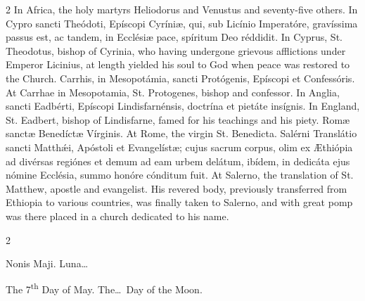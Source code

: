 \begin{paracol}{2}
\switchcolumn
{}
In Africa, the holy martyrs 
 Heliodorus and Venustus and seventy-five others.
\switchcolumn*
{}
In Cypro sancti 
 Theódoti, Epíscopi Cyríniæ, qui, sub Licínio Imperatóre, gravíssima passus 
 est, ac tandem, in Ecclésiæ pace, spíritum Deo réddidit.
\switchcolumn
{}
In Cyprus, St. Theodotus, bishop of 
 Cyrinia, who having undergone grievous afflictions under Emperor Licinius, 
 at length yielded his soul to God when peace was restored to the Church.
\switchcolumn*
{}
Carrhis, in 
 Mesopotámia, sancti Protógenis, Epíscopi et Confessóris.
\switchcolumn
{}
At Carrhae in Mesopotamia, St. 
 Protogenes, bishop and confessor.
\switchcolumn*
{}
In Anglia, sancti 
 Eadbérti, Epíscopi Lindisfarnénsis, doctrína et pietáte insígnis.
\switchcolumn
{}
In England, St. Eadbert, bishop of 
 Lindisfarne, famed for his teachings and his piety.
\switchcolumn*
{}
Romæ sanctæ Benedíctæ 
 Vírginis.
\switchcolumn
{}
At Rome, the virgin St. Benedicta.
\switchcolumn*
{}
Salérni Translátio 
 sancti Matthǽi, Apóstoli et Evangelístæ; cujus sacrum corpus, olim ex 
 Æthiópia ad divérsas regiónes et demum ad eam urbem delátum, ibídem, in 
 dedicáta ejus nómine Ecclésia, summo honóre cónditum fuit.
\switchcolumn
{}
At Salerno, the translation of St. 
 Matthew, apostle and evangelist. His revered body, previously 
 transferred from Ethiopia to various countries, was finally taken to 
 Salerno, and with great pomp was there placed in a church dedicated to his 
 name.
\switchcolumn*
{}
\end{paracol}


\begin{paracol}{2}
\begin{center}{\color{gregoriocolor} Nonis Maji. 
 Luna\dots\ }\end{center}
\switchcolumn
{}
\begin{center}{\color{gregoriocolor} The 
 7\textsuperscript{th} Day of May. The\dots\ Day of the Moon.}\end{center}
\end{paracol}


